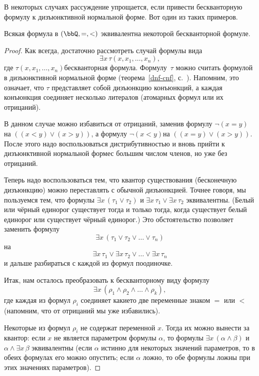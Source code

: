 \medskip

В некоторых случаях рассуждение упрощается, если
привести бескванторную формулу к дизъюнктивной
нормальной форме. Вот один из таких примеров.
\begin{theorem}
%
        \label{quantifier-elimination-dense}
Всякая формула в $(\bbQ,{=},{<})$ эквивалентна
некоторой бескванторной формуле.
\end{theorem}

\begin{proof}
Как всегда, достаточно рассмотреть случай формулы вида
        $$
\exists x \,\tau(x,x_1,\dots,x_n),
        $$
где $\tau(x,x_1,\dots,x_n)$\т бескванторная формула. Формулу~$\tau$
можно считать формулой в дизъюнктивной нормальной форме
(теорема~\ref{dnf-cnf}, с.~\pageref{dnf-cnf}).
Напомним, это означает, что $\tau$ представляет
собой дизъюнкцию конъюнкций, а каждая конъюнкция соединяет
несколько литералов (атомарных формул или их отрицаний).

В данном случае можно избавиться от отрицаний, заменив формулу
$\lnot(x=y)$ на $((x<y)\lor (x>y))$, а формулу $\lnot(x<y)$\т на
$((x=y)\lor(x>y))$. После этого надо воспользоваться
дистрибутивностью и вновь прийти к дизъюнктивной нормальной
форме\т с большим числом членов, но уже без отрицаний.

Теперь надо воспользоваться тем, что квантор
существования ( бесконечную дизъюнкцию) можно переставлять с обычной дизъюнкцией.
Точнее говоря, мы пользуемся тем, что формулы
$\exists x\,(\tau_1 \lor \tau_2)$ и
$\exists x\,\tau_1 \lor  \exists x\,\tau_2$
эквивалентны. (Белый или чёрный единорог существует тогда и
только тогда, когда существует белый единорог или существует
чёрный единорог.) Это обстоятельство позволяет заменить
формулу
        $$
\exists x\, (\tau_1\lor\tau_2\lor\ldots\lor\tau_n)
        $$
на
        $$
\exists x\, \tau_1\lor\exists x\,\tau_2\lor\ldots\lor\exists x\,\tau_n
        $$
и дальше разбираться с каждой из формул поодиночке.

Итак, нам осталось преобразовать к бескванторному виду формулу
        $$
\exists x \, (\rho_1 \land \rho_2 \land\ldots\land\rho_k),
        $$
где каждая из формул $\rho_i$ соединяет какие\д то две переменные
знаком $=$ или $<$ (напомним, что от отрицаний мы уже избавились).

Некоторые из формул $\rho_i$ не содержат переменной $x$. Тогда
их можно вынести за квантор: если $x$ не является параметром
формулы $\alpha$, то формулы
$\exists x\, (\alpha\land\beta)$ и $\alpha \land  \exists x\,\beta$
эквивалентны
(если $\alpha$ истинно для некоторых значений параметров, то
в обеих формулах его можно опустить; если $\alpha$ ложно, то
обе формулы ложны при этих значениях параметров).


\end{proof}

